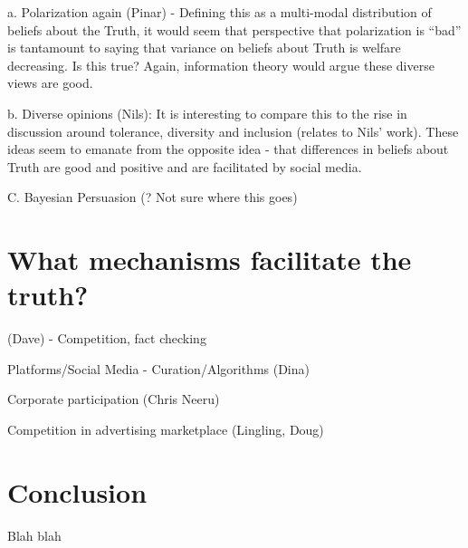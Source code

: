 \documentclass{article}
\begin{document}
\begin{spacing}{2}
a. Polarization again (Pinar) - Defining this as a multi-modal distribution of beliefs about the Truth, it would seem that perspective that polarization is ``bad'' is tantamount to saying that variance on beliefs about Truth is welfare decreasing. Is this true? Again, information theory would argue these diverse views are good.

b. Diverse opinions (Nils): It is interesting to compare this to the rise in discussion around tolerance, diversity and inclusion (relates to Nils' work). These ideas seem to emanate from the opposite idea - that differences in beliefs about Truth are good and positive and are facilitated by social media.


C. Bayesian Persuasion (? Not sure where this goes)

\section{What mechanisms facilitate the truth?}\label{Sec: mechanisms}

\item (Dave) - Competition, fact checking
\item Platforms/Social Media - Curation/Algorithms (Dina)
\item Corporate participation (Chris Neeru)
\item Competition in advertising marketplace (Lingling, Doug)


\section{Conclusion} \label{Sec: conclusion}
Blah blah   



\pagebreak


\pagebreak


\end{spacing}
\end{document}
